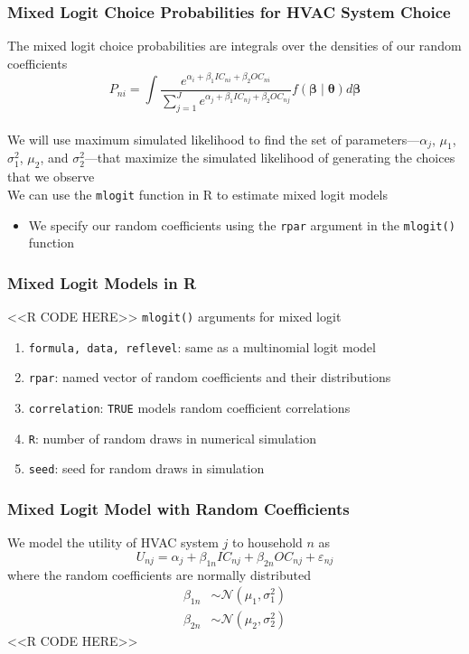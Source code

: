 \documentclass{beamer}
\begin{document}
\begin{frame}\frametitle{Mixed Logit Choice Probabilities for HVAC System Choice}
    The mixed logit choice probabilities are integrals over the densities of our random coefficients
    $$P_{ni} = \int \frac{e^{\alpha_i + \beta_1 IC_{ni} + \beta_2 OC_{ni}}}{\sum_{j = 1}^J e^{\alpha_j + \beta_1 IC_{nj} + \beta_2 OC_{nj}}} f(\bm{\beta} \mid \bm{\theta}) d \bm{\beta}$$ \\
    \vspace{2ex}
    We will use maximum simulated likelihood to find the set of parameters---$\alpha_j$, $\mu_1$, $\sigma_1^2$, $\mu_2$, and $\sigma_2^2$---that maximize the simulated likelihood of generating the choices that we observe \\
    \vspace{2ex}
    We can use the \texttt{mlogit} function in R to estimate mixed logit models
    \begin{itemize}
        \item We specify our random coefficients using the \texttt{rpar} argument in the \texttt{mlogit()} function
    \end{itemize}
\end{frame}

\begin{frame}[fragile]\frametitle{Mixed Logit Models in R}
    <<R CODE HERE>>
    \vspace{2ex}
    \texttt{mlogit()} arguments for mixed logit
    \begin{enumerate}
        \item \texttt{formula, data, reflevel}: same as a multinomial logit model
        \item \texttt{rpar}: named vector of random coefficients and their distributions
        \item \texttt{correlation}: \texttt{TRUE} models random coefficient correlations
        \item \texttt{R}: number of random draws in numerical simulation
        \item \texttt{seed}: seed for random draws in simulation
    \end{enumerate}
\end{frame}

\begin{frame}[fragile]\frametitle{Mixed Logit Model with Random Coefficients}
    We model the utility of HVAC system $j$ to household $n$ as
    $$U_{nj} = \alpha_j + \beta_{1n} IC_{nj} + \beta_{2n} OC_{nj} + \varepsilon_{nj}$$
	where the random coefficients are normally distributed
	\begin{align*}
		\beta_{1n} & \sim \mathcal{N}(\mu_1, \sigma_1^2) \\
		\beta_{2n} & \sim \mathcal{N}(\mu_2, \sigma_2^2)
	\end{align*}
    <<R CODE HERE>>
\end{frame}
\end{document}
